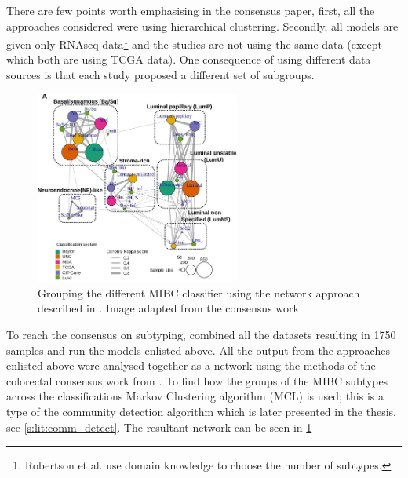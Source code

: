 There are few points worth emphasising in the consensus paper, first, all the approaches\cite{Mo2018-rl, Damrauer2014-tc, Choi2014-ed, Marzouka2018-ge, Rebouissou2014-ep,Robertson2017-mg} considered were using hierarchical clustering. Secondly, all models are given only RNAseq data\footnote{Robertson et al. use domain knowledge to choose the number of subtypes.} and the studies are not using the same data (except \cite{Robertson2017-mg, Mo2018-rl} which both are using TCGA data). One consequence of using different data sources is that each study proposed a different set of subgroups. 

\begin{figure}[!htb]    
    \centering
\includegraphics[width=0.6\textwidth,height=0.6\textheight,keepaspectratio]{Sections/Lit_review/Resources/consensus_network_classifier.jpg}
    \caption{Grouping the different MIBC classifier using the network approach described in \citet{Guinney2015-fy}. Image adapted from the consensus work \citet{Kamoun2020-tj}.}
    \label{fig:lit:consensus_network}
\end{figure}


To reach the consensus on subtyping, \citet{Kamoun2020-tj} combined all the datasets resulting in 1750 samples and run the models enlisted above. All the output from the approaches enlisted above were analysed together as a network using the methods of the colorectal consensus work from \citet{Guinney2015-fy}. To find how the groups of the MIBC subtypes across the classifications Markov Clustering algorithm (MCL) \citet{Van_Dongen2008-yj} is used; this is a type of the community detection algorithm which is later presented in the thesis, see \cref{s:lit:comm_detect}. The resultant network can be seen in \cref{fig:lit:consensus_network}


